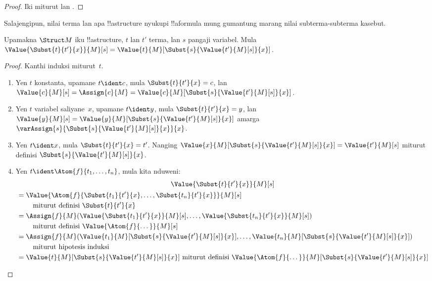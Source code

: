 \documentclass[../../../include/open-logic-section]{subfiles}
\begin{document}
\begin{proof}
Iki miturut  lan
.
\end{proof}

Salajengipun, nilai terma lan apa !!a{structure}
nyukupi !!a{formula} mung gumantung marang
nilai subterma-subterma kasebut.

\begin{prop}
Upamakna $\Struct M$ iku !!a{structure}, $t$ lan
$t'$ terma, lan $s$ pangaji variabel. Mula
$\Value{\Subst{t}{t'}{x}}{M}[s] =
\Value{t}{M}[\Subst{s}{\Value{t'}{M}[s]}{x}]$.
\end{prop}

\begin{proof}
Kanthi induksi miturut~$t$.
\begin{enumerate}
\item Yen $t$ konstanta, upamane $t\ident c$, mula
  $\Subst{t}{t'}{x} = c$, lan $\Value{c}{M}[s] =
  \Assign{c}{M} =
  \Value{c}{M}[\Subst{s}{\Value{t'}{M}[s]}{x}]$.

\item Yen $t$ variabel saliyane~$x$, upamane
  $t \ident y$, mula $\Subst{t}{t'}{x} = y$, lan
  $\Value{y}{M}[s] =
  \Value{y}{M}[\Subst{s}{\Value{t'}{M}[s]}{x}]$
  amarga $\varAssign{s}{\Subst{s}{\Value{t'}{M}[s]}{x}}{x}$.

\item Yen $t \ident x$, mula $\Subst{t}{t'}{x} = t'$.
  Nanging
  $\Value{x}{M}[\Subst{s}{\Value{t'}{M}[s]}{x}] =
  \Value{t'}{M}[s]$ miturut definisi
  $\Subst{s}{\Value{t'}{M}[s]}{x}$.

\item Yen $t \ident \Atom{f}{t_1,\dots,t_n}$,
mula kita nduweni:
\begin{multline*}
  \Value{\Subst{t}{t'}{x}}{M}[s] \\
  \begin{aligned}[b]
& = \Value{\Atom{f}{\Subst{t_1}{t'}{x}, \dots, \Subst{t_n}{t'}{x}}}{M}[s]\\
& \qquad    \text{ miturut definisi $\Subst{t}{t'}{x}$}\\
& = \Assign{f}{M}(\Value{\Subst{t_1}{t'}{x}}{M}[s], \dots,
    \Value{\Subst{t_n}{t'}{x}}{M}[s])\\
    & \qquad  \text{ miturut definisi $\Value{\Atom{f}{\dots}}{M}[s]$}\\
& = \Assign{f}{M}(\Value{t_1}{M}[\Subst{s}{\Value{t'}{M}[s]}{x}], \dots,
   \Value{t_n}{M}[\Subst{s}{\Value{t'}{M}[s]}{x}])\\
& \qquad    \text{ miturut hipotesis induksi}\\
& = \Value{t}{M}[\Subst{s}{\Value{t'}{M}[s]}{x}]
    \text{ miturut definisi $\Value{\Atom{f}{\dots}}{M}[\Subst{s}{\Value{t'}{M}[s]}{x}]$}
  \end{aligned}
\end{multline*}
\end{enumerate}
\end{proof}
\end{document}
